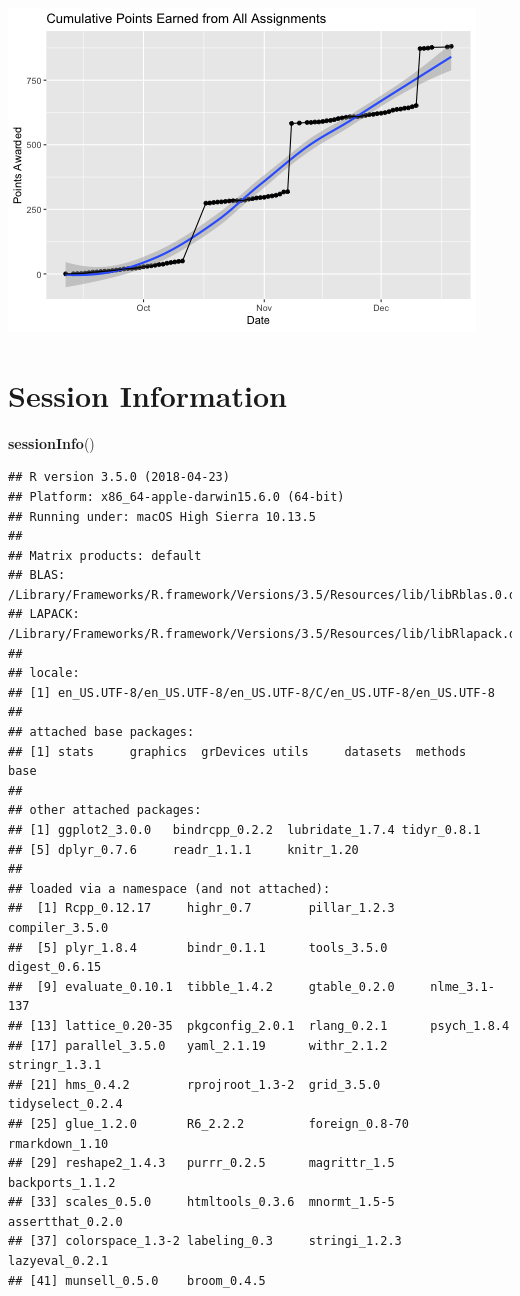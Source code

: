 \documentclass[]{article}
\newenvironment{Shaded}{\begin{snugshade}}{\end{snugshade}}
\newcommand{\KeywordTok}[1]{\textcolor[rgb]{0.13,0.29,0.53}{\textbf{#1}}}
\newcommand{\NormalTok}[1]{#1}
\begin{document}
\includegraphics{figures/submitted-assignments-midterms-1.png}

\section{Session Information}\label{session-information}

\begin{Shaded}
\begin{Highlighting}[]
\KeywordTok{sessionInfo}\NormalTok{()}
\end{Highlighting}
\end{Shaded}

\begin{verbatim}
## R version 3.5.0 (2018-04-23)
## Platform: x86_64-apple-darwin15.6.0 (64-bit)
## Running under: macOS High Sierra 10.13.5
## 
## Matrix products: default
## BLAS: /Library/Frameworks/R.framework/Versions/3.5/Resources/lib/libRblas.0.dylib
## LAPACK: /Library/Frameworks/R.framework/Versions/3.5/Resources/lib/libRlapack.dylib
## 
## locale:
## [1] en_US.UTF-8/en_US.UTF-8/en_US.UTF-8/C/en_US.UTF-8/en_US.UTF-8
## 
## attached base packages:
## [1] stats     graphics  grDevices utils     datasets  methods   base     
## 
## other attached packages:
## [1] ggplot2_3.0.0   bindrcpp_0.2.2  lubridate_1.7.4 tidyr_0.8.1    
## [5] dplyr_0.7.6     readr_1.1.1     knitr_1.20     
## 
## loaded via a namespace (and not attached):
##  [1] Rcpp_0.12.17     highr_0.7        pillar_1.2.3     compiler_3.5.0  
##  [5] plyr_1.8.4       bindr_0.1.1      tools_3.5.0      digest_0.6.15   
##  [9] evaluate_0.10.1  tibble_1.4.2     gtable_0.2.0     nlme_3.1-137    
## [13] lattice_0.20-35  pkgconfig_2.0.1  rlang_0.2.1      psych_1.8.4     
## [17] parallel_3.5.0   yaml_2.1.19      withr_2.1.2      stringr_1.3.1   
## [21] hms_0.4.2        rprojroot_1.3-2  grid_3.5.0       tidyselect_0.2.4
## [25] glue_1.2.0       R6_2.2.2         foreign_0.8-70   rmarkdown_1.10  
## [29] reshape2_1.4.3   purrr_0.2.5      magrittr_1.5     backports_1.1.2 
## [33] scales_0.5.0     htmltools_0.3.6  mnormt_1.5-5     assertthat_0.2.0
## [37] colorspace_1.3-2 labeling_0.3     stringi_1.2.3    lazyeval_0.2.1  
## [41] munsell_0.5.0    broom_0.4.5
\end{verbatim}
\end{document}
